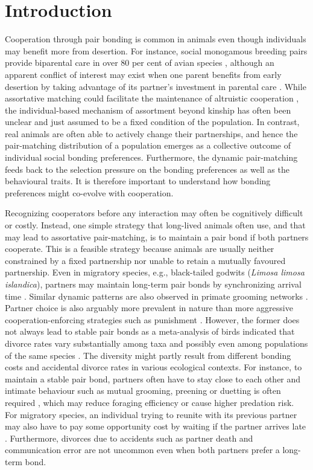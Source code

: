 \documentclass[12pt]{article}
\begin{document}
\newpage

\section*{Introduction}

Cooperation through pair bonding is common in animals even though individuals may benefit more from desertion. For instance, social monogamous breeding pairs provide biparental care in over 80 per cent of avian species \citep{Cockburn2006}, although an apparent conflict of interest may exist when one parent benefits from early desertion by taking advantage of its partner's investment in parental care \citep{Grafen.Sibly1978, Clutton-Brock1991, Arnold2002}. While assortative matching could facilitate the maintenance of altruistic cooperation \citep{Fletcher.Doebeli2006}, the individual-based mechanism of assortment beyond kinship has often been unclear and just assumed to be a fixed condition of the population. In contrast, real animals are often able to actively change their partnerships, and hence the pair-matching distribution of a population emerges as a collective outcome of individual social bonding preferences. Furthermore, the dynamic pair-matching feeds back to the selection pressure on the bonding preferences as well as the behavioural traits. It is therefore important to understand how bonding preferences might co-evolve with cooperation. 

Recognizing cooperators before any interaction may often be cognitively difficult or costly. Instead, one simple strategy that long-lived animals often use, and that may lead to assortative pair-matching, is to maintain a pair bond if both partners cooperate. This is a feasible strategy because animals are usually neither constrained by a fixed partnership nor unable to retain a mutually favoured partnership. Even in migratory species, e.g., black-tailed godwits (\textit{Limosa limosa islandica}), partners may maintain long-term pair bonds by synchronizing arrival time \citep{Gunnarsson.etal2004}. Similar dynamic patterns are also observed in primate grooming networks \citep{Smuts1985}. Partner choice is also arguably more prevalent in nature than more aggressive cooperation-enforcing strategies such as punishment \citep{Noe.Hammerstein1994}. However, the former does not always lead to stable pair bonds as a meta-analysis of birds indicated that divorce rates vary substantially among taxa and possibly even among populations of the same species \citep{Jeschke.Kokko2008}. The diversity might partly result from different bonding costs and accidental divorce rates in various ecological contexts. For instance, to maintain a stable pair bond, partners often have to stay close to each other and intimate behaviour such as mutual grooming, preening or duetting is often required \citep{Roughgarden2012}, which may reduce foraging efficiency or cause higher predation risk. For migratory species, an individual trying to reunite with its previous partner may also have to pay some opportunity cost by waiting if the partner arrives late \citep{Ens1996}. Furthermore, divorces due to accidents such as partner death and communication error are not uncommon even when both partners prefer a long-term bond. 
\end{document}
